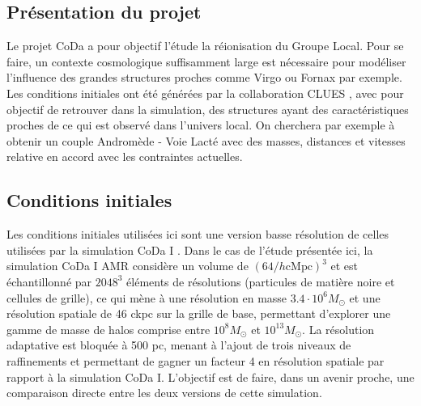 \subsection{Présentation du projet}

Le projet \ac{CoDa} a pour objectif l’étude la réionisation du Groupe Local. %
Pour se faire, un contexte cosmologique suffisamment large est nécessaire pour modéliser l'influence des grandes structures proches comme Virgo ou Fornax par exemple.
Les conditions initiales ont été générées par la collaboration \ac{CLUES} \citep{2010arXiv1005.2687G}, avec pour objectif de retrouver dans la simulation, des structures ayant des caractéristiques proches de ce qui est observé dans l'univers local.
On cherchera par exemple à obtenir un couple Andromède - Voie Lacté avec des masses, distances et vitesses relative en accord avec les contraintes actuelles.

\subsection{Conditions initiales}
\label{sec:ICCODA}
Les conditions initiales utilisées ici sont une version basse résolution de celles utilisées par la simulation \ac{CoDa} I \citep{ocvirk_cosmic_2015}.
Dans le cas de l'étude présentée ici, la simulation \ac{CoDa} I AMR considère un volume de $\left( 64/h \mathrm{cMpc} \right)^3$ et est échantillonné par $2048^3$ éléments de résolutions (particules de matière noire et cellules de grille), ce qui mène à une résolution en masse $3.4 \cdot 10^6 M_\odot$ et une résolution spatiale de 46 ckpc sur la grille de base, permettant d'explorer une gamme de masse de halos comprise entre $10^8 M_\odot$ et $10^{13}M_\odot$.
La résolution adaptative est bloquée à 500 pc, menant à l'ajout de trois niveaux de raffinements et permettant de gagner un facteur 4 en résolution spatiale par rapport à la simulation  \ac{CoDa} I.
L'objectif est de faire, dans un avenir proche, une comparaison directe entre les deux versions de cette simulation. %

